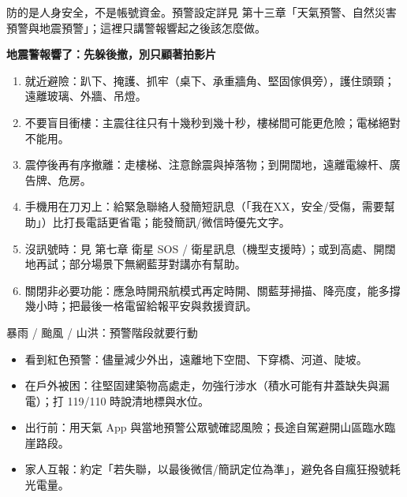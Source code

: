 


防的是人身安全，不是帳號資金。預警設定詳見 第十三章「天氣預警、自然災害預警與地震預警」；這裡只講警報響起之後該怎麼做。

\textbf{地震警報響了：先躲後撤，別只顧著拍影片}\par

\begin{enumerate}
  \item 就近避險：趴下、掩護、抓牢（桌下、承重牆角、堅固傢俱旁），護住頭頸；遠離玻璃、外牆、吊燈。
  \item 不要盲目衝樓：主震往往只有十幾秒到幾十秒，樓梯間可能更危險；電梯絕對不能用。
  \item 震停後再有序撤離：走樓梯、注意餘震與掉落物；到開闊地，遠離電線杆、廣告牌、危房。
  \item 手機用在刀刃上：給緊急聯絡人發簡短訊息（「我在XX，安全/受傷，需要幫助」）比打長電話更省電；能發簡訊/微信時優先文字。
  \item 沒訊號時：見 第七章 衛星 SOS / 衛星訊息（機型支援時）；或到高處、開闊地再試；部分場景下無網藍芽對講亦有幫助。
  \item 關閉非必要功能：應急時開飛航模式再定時開、關藍芽掃描、降亮度，能多撐幾小時；把最後一格電留給報平安與救援資訊。
\end{enumerate}

\begin{tcbwarn}{暴雨 / 颱風 / 山洪：預警階段就要行動}
\begin{itemize}
  \item 看到紅色預警：儘量減少外出，遠離地下空間、下穿橋、河道、陡坡。
  \item 在戶外被困：往堅固建築物高處走，勿強行涉水（積水可能有井蓋缺失與漏電）；打 119/110 時說清地標與水位。
  \item 出行前：用天氣 App 與當地預警公眾號確認風險；長途自駕避開山區臨水臨崖路段。
  \item 家人互報：約定「若失聯，以最後微信/簡訊定位為準」，避免各自瘋狂撥號耗光電量。
\end{itemize}

\end{tcbwarn}

